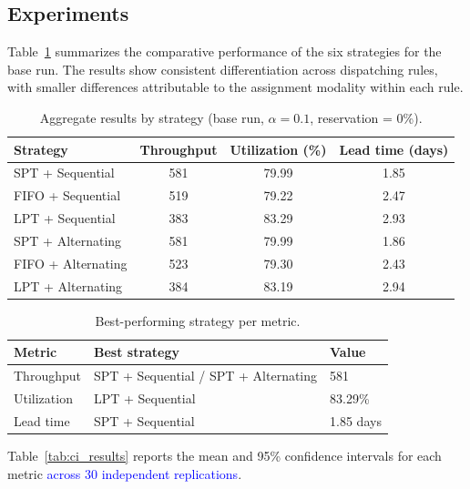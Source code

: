 \documentclass[sn-mathphys-num]{sn-jnl}
\begin{document}
\subsection{Experiments}\label{sec:exp}

Table~\ref{tab:main_results} summarizes the comparative performance of
the six strategies for the base run. The results show consistent
differentiation across dispatching rules, with smaller differences
attributable to the assignment modality within each rule.

\begin{table}[]
\centering
\caption{Aggregate results by strategy (base run, $\alpha = 0.1$,
reservation = 0\%).}
\label{tab:main_results}
\begin{tabular}{lccc}
\toprule
Strategy & Throughput & Utilization (\%) & Lead time (days) \\
\midrule
SPT + Sequential  & 581 & 79.99 & 1.85 \\
FIFO + Sequential & 519 & 79.22 & 2.47 \\
LPT + Sequential  & 383 & 83.29 & 2.93 \\
SPT + Alternating & 581 & 79.99 & 1.86 \\
FIFO + Alternating & 523 & 79.30 & 2.43 \\
LPT + Alternating & 384 & 83.19 & 2.94 \\
\bottomrule
\end{tabular}
\end{table}

\begin{table}[]
\centering
\caption{Best-performing strategy per metric.}
\label{tab:best_by_metric}
\begin{tabular}{lll}
\toprule
Metric & Best strategy & Value \\
\midrule
Throughput  & SPT + Sequential / SPT + Alternating & 581 \\
Utilization & LPT + Sequential & 83.29\% \\
Lead time   & SPT + Sequential & 1.85 days \\
\bottomrule
\end{tabular}
\end{table}

Table~\ref{tab:ci_results} reports the mean and 95\% confidence
intervals for each metric \textcolor{blue}{across 30 independent replications}.
\end{document}
